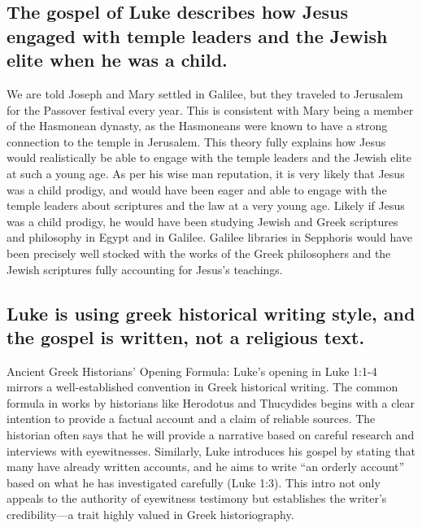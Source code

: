 \subsection{The gospel of Luke describes how Jesus engaged with temple leaders and the Jewish elite when he was a child.}\label{subsec:the-gospel-of-luke-describes-how-jesus-engaged-with-temple-leaders-and-the-jewish-elite-when-he-was-a-child.}

We are told Joseph and Mary settled in Galilee, but they traveled to Jerusalem for the Passover festival every year.
This is consistent with Mary being a member of the Hasmonean dynasty, as the Hasmoneans were known to have a strong connection to the temple in Jerusalem.
This theory fully explains how Jesus would realistically be able to engage with the temple leaders and the Jewish elite at such a young age.
As per his wise man reputation, it is very likely that Jesus was a child prodigy, and would have been eager and able to engage with the temple leaders about scriptures and the law at a very young age.
Likely if Jesus was a child prodigy, he would have been studying Jewish and Greek scriptures and philosophy in Egypt and in Galilee.
Galilee libraries in Sepphoris would have been precisely well stocked with the works of the Greek philosophers and the Jewish scriptures fully accounting for Jesus's teachings.

\subsection{Luke is using greek historical writing style, and the gospel is written, not a religious text.}\label{subsec:luke-is-using-greek-historical-writing-style-and-the-gospel-is-written-not-a-religious-text.}

Ancient Greek Historians' Opening Formula: Luke's opening in Luke 1:1-4 mirrors a well-established convention in Greek historical writing.
The common formula in works by historians like Herodotus \cite{herodotus:histories} and Thucydides \cite{thucydides:peloponnesian} begins with a clear intention to provide a factual account and a claim of reliable sources.
The historian often says that he will provide a narrative based on careful research and interviews with eyewitnesses.
Similarly, Luke introduces his gospel by stating that many have already written accounts, and he aims to write ``an orderly account'' based on what he has investigated carefully (Luke 1:3).
This intro not only appeals to the authority of eyewitness testimony but establishes the writer's credibility---a trait highly valued in Greek historiography.

